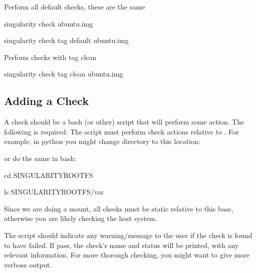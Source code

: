 \documentclass[letterpaper,10pt,english]{sphinxmanual}
\begin{document}
%
\begin{sphinxVerbatim}[commandchars=\\\{\}]
\PYGZsh{} Perform all default checks, these are the same

\PYGZdl{} singularity check ubuntu.img

\PYGZdl{} singularity check \PYGZhy{}\PYGZhy{}tag default ubuntu.img


\PYGZsh{} Perform checks with tag \PYGZdq{}clean\PYGZdq{}

\PYGZdl{} singularity check \PYGZhy{}\PYGZhy{}tag clean ubuntu.img
\end{sphinxVerbatim}


\subsection{Adding a Check}
\label{\detokenize{container_checks:adding-a-check}}
A check should be a bash (or other) script that will perform some
action. The following is required:
 The script must perform check
actions relative to . For example, in python you might change
directory to this location:

%
\begin{sphinxVerbatim}[commandchars=\\\{\}]
 

  \PYG{p}{[}\PYG{p}{]}

\end{sphinxVerbatim}

or do the same in bash:

%
\begin{sphinxVerbatim}[commandchars=\\\{\}]
cd \PYGZdl{}SINGULARITY\PYGZus{}ROOTFS

ls \PYGZdl{}SINGULARITY\PYGZus{}ROOTFS/var
\end{sphinxVerbatim}

Since we are doing a mount, all checks must be static relative to this
base, otherwise you are likely checking the host system.

 The script should indicate any warning/message to the user
if the check is found to have failed. If pass, the check’s name and
status will be printed, with any relevant information. For more
thorough checking, you might want to give more verbose output.
\end{document}
